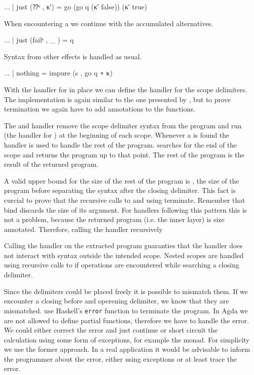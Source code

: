 \begin{AgdaAlign}
\begin{code}
    ... | just (⁇ˢ     , κ′)  = go (go q (κ′ false)) (κ′ true)
\end{code}
When encountering a  we continue with the accumulated
alternatives.

\begin{code}
    ... | just (failˢ  , _ )  = q
\end{code}
Syntax from other effects is handled as usual.

\begin{code}
    ... | nothing             = impure (s , go q ∘ κ)
\end{code}
\end{AgdaAlign}
With the handler for  in place we can define the handler for the
scope delimiters.
The implementation is again similar to the one presented by
\textcite{DBLP:conf/haskell/WuSH14}, but to prove termination we again have to
add  annotations to the functions.

The  and  handler remove the scope
delimiter syntax from the program and run  (the handler
for ) at the beginning of each scope.
Whenever a  is found the handler  is
used to handle the rest of the program.
 searches for the end of the scope and returns the program
up to that point.
The rest of the program is the result of the returned program.

A valid upper bound for the size of the rest of the program is ,
the size of the program before separating the syntax after the closing delimiter.
This fact is curcial to prove that the recursive calls to  and
 using \AgdaFunction{>>=} terminate.
Remember that bind discards the size of its argument.
For handlers following this pattern this is not a problem, because the returned
program (i.e. the inner  layer) is size annotated.
Therefore, calling the handler recursively 


Calling the handler on the extracted program guaranties that the handler does
not interact with syntax outside the intended scope.
Nested scopes are handled using recursive calls to  if
 operations are encountered while searching a closing
delimiter.

Since the delimiters could be placed freely it is possible to mismatch them.
If we encounter a closing before and operening delimiter, we know that they are
mismatched.
\textcite{DBLP:conf/haskell/WuSH14} use Haskell's \texttt{error} function to
terminate the program.
In Agda we are not allowed to define partial functions, therefore we have to
handle the error.
We could either correct the error and just continue or short circuit the
calculation using some form of exceptions, for example the 
monad.
For simplicity we use the former approach.
In a real application it would be advisable to inform the programmer about the
error, either using exceptions or at least trace the error.

